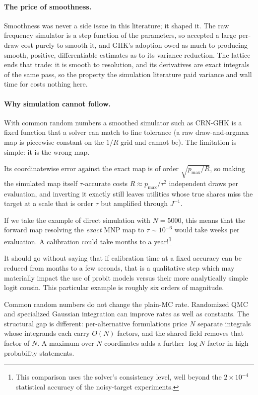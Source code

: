 \documentclass[12pt]{article}
\theoremstyle{remark}
\begin{document}
\paragraph{The price of smoothness.} Smoothness was never a side
issue in this literature; it shaped it. The raw frequency simulator is a
step function of the parameters, so \citet{stern1992} accepted a large
per-draw cost purely to smooth it, and GHK's adoption owed as much to
producing smooth, positive, differentiable estimates
\citep{hajivassiliou1998} as to its variance reduction. The lattice ends
that trade: it is smooth to resolution, and its derivatives are exact
integrals of the same pass, so the property the simulation literature
paid variance and wall time for costs nothing here.

\paragraph{Why simulation cannot follow.} With common random numbers a
smoothed simulator such as CRN-GHK is a fixed function that a solver can
match to fine tolerance (a raw draw-and-argmax map is piecewise constant on
the $1/R$ grid and cannot be). The limitation is simple: it is the
wrong map.

Its coordinatewise error against the exact map is of order
$\sqrt{p_{\max}/R}$, so making the simulated map itself $\tau$-accurate
costs $R \approx p_{\max}/\tau^2$ independent draws per evaluation, and
inverting it exactly still leaves utilities whose true shares miss the
target at a scale that is order $\tau$ but amplified through $J^{-1}$.

If we take the example of direct simulation with $N = 5000$, this
means that the forward map resolving the \emph{exact} MNP map to $\tau \sim
10^{-6}$  would take
weeks per evaluation. A calibration could take months to a year!\footnote{This comparison uses the solver's consistency level, well beyond the $2\times10^{-4}$ statistical accuracy of the noisy-target experiments.} 

It should go without saying that if calibration time at a fixed accuracy can be reduced from
months to a few seconds, that is a qualitative step which may materially impact the 
use of probit models versus their more analytically simple logit cousin. This particular example is roughly six orders of magnitude. 

Common random numbers do not change the plain-MC rate. Randomized QMC and
specialized Gaussian integration can improve rates as well as
constants. The structural gap is different: per-alternative
formulations price $N$ separate integrals whose integrands each carry
$O(N)$ factors, and the shared field removes that factor of $N$. A
maximum over $N$ coordinates adds a further $\log N$ factor in
high-probability statements.
\end{document}
